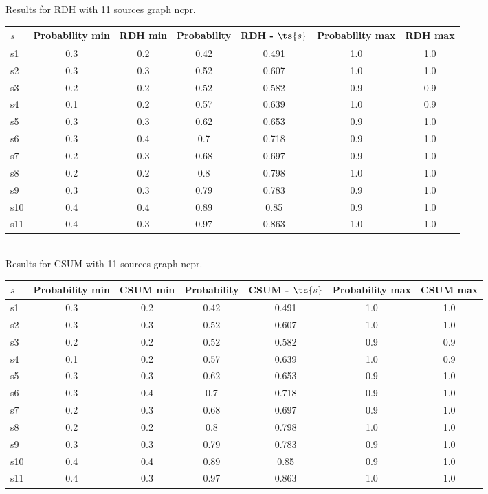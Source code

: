 \documentclass{article}
\begin{document}
\noindent Results for RDH with 11 sources graph ncpr.

\noindent\begin{tabular}{|l|c|c|c|c|c|c|}
\hline
$s$& Probability min & RDH min & Probability & RDH - $\ts{s}$ & Probability max & RDH max\\
\hline
s1 &0.3 & 0.2 & 0.42 & 0.491 & 1.0 & 1.0\\
\hline
s2 &0.3 & 0.3 & 0.52 & 0.607 & 1.0 & 1.0\\
\hline
s3 &0.2 & 0.2 & 0.52 & 0.582 & 0.9 & 0.9\\
\hline
s4 &0.1 & 0.2 & 0.57 & 0.639 & 1.0 & 0.9\\
\hline
s5 &0.3 & 0.3 & 0.62 & 0.653 & 0.9 & 1.0\\
\hline
s6 &0.3 & 0.4 & 0.7 & 0.718 & 0.9 & 1.0\\
\hline
s7 &0.2 & 0.3 & 0.68 & 0.697 & 0.9 & 1.0\\
\hline
s8 &0.2 & 0.2 & 0.8 & 0.798 & 1.0 & 1.0\\
\hline
s9 &0.3 & 0.3 & 0.79 & 0.783 & 0.9 & 1.0\\
\hline
s10 &0.4 & 0.4 & 0.89 & 0.85 & 0.9 & 1.0\\
\hline
s11 &0.4 & 0.3 & 0.97 & 0.863 & 1.0 & 1.0\\
\hline
\end{tabular}\\

\noindent Results for CSUM with 11 sources graph ncpr.

\noindent\begin{tabular}{|l|c|c|c|c|c|c|}
\hline
$s$& Probability min & CSUM min & Probability & CSUM - $\ts{s}$ & Probability max & CSUM max\\
\hline
s1 &0.3 & 0.2 & 0.42 & 0.491 & 1.0 & 1.0\\
\hline
s2 &0.3 & 0.3 & 0.52 & 0.607 & 1.0 & 1.0\\
\hline
s3 &0.2 & 0.2 & 0.52 & 0.582 & 0.9 & 0.9\\
\hline
s4 &0.1 & 0.2 & 0.57 & 0.639 & 1.0 & 0.9\\
\hline
s5 &0.3 & 0.3 & 0.62 & 0.653 & 0.9 & 1.0\\
\hline
s6 &0.3 & 0.4 & 0.7 & 0.718 & 0.9 & 1.0\\
\hline
s7 &0.2 & 0.3 & 0.68 & 0.697 & 0.9 & 1.0\\
\hline
s8 &0.2 & 0.2 & 0.8 & 0.798 & 1.0 & 1.0\\
\hline
s9 &0.3 & 0.3 & 0.79 & 0.783 & 0.9 & 1.0\\
\hline
s10 &0.4 & 0.4 & 0.89 & 0.85 & 0.9 & 1.0\\
\hline
s11 &0.4 & 0.3 & 0.97 & 0.863 & 1.0 & 1.0\\
\hline
\end{tabular}\\
\end{document}

